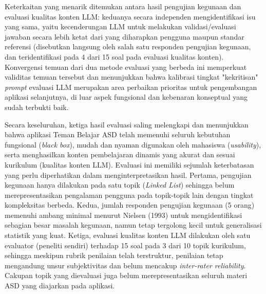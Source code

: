 Keterkaitan yang menarik ditemukan antara hasil pengujian kegunaan dan evaluasi kualitas konten LLM: keduanya secara independen mengidentifikasi isu yang sama, yaitu kecenderungan LLM untuk melakukan validasi/evaluasi jawaban secara lebih ketat dari yang diharapkan pengguna maupun standar referensi (disebutkan langsung oleh salah satu responden pengujian kegunaan, dan teridentifikasi pada 4 dari 15 soal pada evaluasi kualitas konten). Konvergensi temuan dari dua metode evaluasi yang berbeda ini memperkuat validitas temuan tersebut dan menunjukkan bahwa kalibrasi tingkat "kekritisan" \textit{prompt} evaluasi LLM merupakan area perbaikan prioritas untuk pengembangan aplikasi selanjutnya, di luar aspek fungsional dan kebenaran konseptual yang sudah terbukti baik.

Secara keseluruhan, ketiga hasil evaluasi saling melengkapi dan menunjukkan bahwa aplikasi Teman Belajar ASD telah memenuhi seluruh kebutuhan fungsional (\textit{black box}), mudah dan nyaman digunakan oleh mahasiswa (\textit{usability}), serta menghasilkan konten pembelajaran dinamis yang akurat dan sesuai kurikulum (kualitas konten LLM). Evaluasi ini memiliki sejumlah keterbatasan yang perlu diperhatikan dalam menginterpretasikan hasil. Pertama, pengujian kegunaan hanya dilakukan pada satu topik (\textit{Linked List}) sehingga belum merepresentasikan pengalaman pengguna pada topik-topik lain dengan tingkat kompleksitas berbeda. Kedua, jumlah responden pengujian kegunaan (5 orang) memenuhi ambang minimal menurut Nielsen (1993) untuk mengidentifikasi sebagian besar masalah kegunaan, namun tetap tergolong kecil untuk generalisasi statistik yang kuat. Ketiga, evaluasi kualitas konten LLM dilakukan oleh satu evaluator (peneliti sendiri) terhadap 15 soal pada 3 dari 10 topik kurikulum, sehingga meskipun rubrik penilaian telah terstruktur, penilaian tetap mengandung unsur subjektivitas dan belum mencakup \textit{inter-rater reliability}. Cakupan topik yang dievaluasi juga belum merepresentasikan seluruh materi ASD yang diajarkan pada aplikasi.
